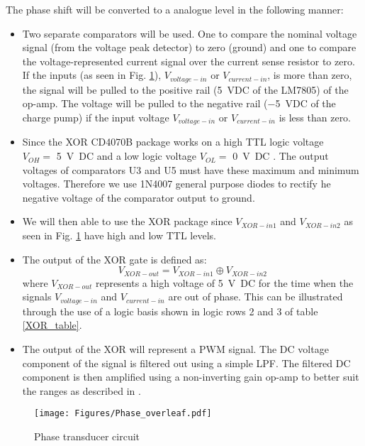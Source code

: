 The phase shift will be converted to a analogue level in the following manner:
\begin{itemize}
    \item Two separate comparators will be used.
    One to compare the nominal voltage signal (from the voltage peak detector) to zero (ground) and one to compare the voltage-represented current signal over the current sense resistor to zero. If the inputs (as seen in Fig. \ref{fig:phase_diag}), $V_{voltage-in}$ or $V_{current-in}$, is more than zero, the signal will be pulled to the positive rail (\SI{+5}{VDC} of the LM7805) of the op-amp. The voltage will be pulled to the negative rail (\SI{-5}{VDC} of the charge pump) if the input voltage $V_{voltage-in}$ or $V_{current-in}$ is less than zero.
    \item Since the XOR CD4070B package works on a high TTL logic voltage \\$V_{OH}=$ \SI{5}{\volt DC} and a low logic voltage $V_{OL}=$ \SI{0}{\volt DC} \cite{CD4070b}. The output voltages of comparators U3 and U5 must have these maximum and minimum voltages. Therefore we use 1N4007 general purpose diodes to rectify he negative voltage of the comparator output to ground.
    \item We will then able to use the XOR package since $V_{XOR-in1}$ and $V_{XOR-in2}$ as seen in Fig. \ref{fig:phase_diag} have high and low TTL levels.
    \item The output of the XOR gate is defined as:$$V_{XOR-out}=V_{XOR-in1} \oplus V_{XOR-in2}$$ where $V_{XOR-out}$ represents a high voltage of \SI{5}{\volt DC} for the time when the signals $V_{voltage-in}$ and $V_{current-in}$ are out of phase. This can be illustrated through the use of a logic basis shown in logic rows 2 and 3 of table \ref{XOR_table}. 
    \item The output of the XOR will represent a PWM signal. The DC voltage component of the signal is filtered out using a simple LPF. The filtered DC component is then amplified using a non-inverting gain op-amp to better suit the ranges as described in \cite{assignment_2}.
\end{itemize}



\begin{figure}[H]
    \centering
    \texttt{[image: Figures/Phase\_overleaf.pdf]}
    \caption{Phase transducer circuit}
    \label{fig:phase_diag}
\end{figure}

